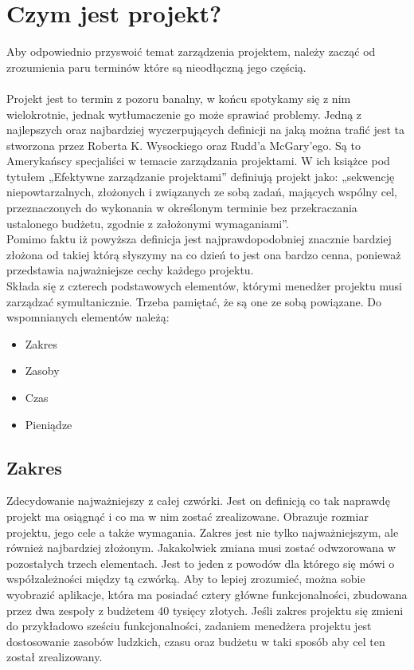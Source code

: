 \documentclass[oneside,polski,logo]{amuthesis}
\begin{document}
\section{Czym jest projekt?}
Aby odpowiednio przyswoić temat zarządzenia projektem, należy zacząć od zrozumienia paru terminów  które są nieodłączną jego częścią. \\ \\
Projekt jest to termin z pozoru banalny, w końcu spotykamy się z nim wielokrotnie, jednak wytłumaczenie go może sprawiać problemy. Jedną z najlepszych oraz najbardziej wyczerpujących definicji na jaką można trafić jest ta stworzona przez Roberta K. Wysockiego oraz Rudd’a McGary'ego. Są to Amerykańscy specjaliści w temacie zarządzania projektami. W ich książce pod tytułem „Efektywne zarządzanie projektami” definiują projekt jako: „sekwencję niepowtarzalnych, złożonych i związanych ze sobą zadań, mających wspólny cel, przeznaczonych do wykonania w określonym terminie bez przekraczania ustalonego budżetu, zgodnie z założonymi wymaganiami”. \cite{projekt} \\

Pomimo faktu iż powyższa definicja jest najprawdopodobniej znacznie bardziej złożona od takiej którą słyszymy na co dzień to jest ona bardzo cenna, ponieważ przedstawia najważniejsze cechy każdego projektu.\\

Składa się z czterech podstawowych elementów, którymi menedżer projektu musi zarządzać symultanicznie. Trzeba pamiętać, że są one ze sobą powiązane. Do wspomnianych elementów należą: 
\begin{itemize}
	\item Zakres
	\item Zasoby
	\item Czas
	\item Pieniądze
\end{itemize}

\subsection {Zakres}
Zdecydowanie najważniejszy z całej czwórki. Jest on definicją co tak naprawdę projekt ma osiągnąć i co ma w nim zostać zrealizowane. Obrazuje rozmiar projektu, jego cele a także wymagania. Zakres jest nie tylko najważniejszym, ale również najbardziej złożonym. Jakakolwiek zmiana musi zostać odwzorowana w pozostałych trzech elementach. Jest to jeden z powodów dla którego się mówi o współzależności między tą czwórką. Aby to lepiej zrozumieć, można sobie wyobrazić aplikacje, która ma posiadać cztery główne funkcjonalności, zbudowana przez dwa zespoły z budżetem 40 tysięcy złotych. Jeśli zakres projektu się zmieni do przykładowo sześciu funkcjonalności, zadaniem menedżera projektu jest dostosowanie zasobów ludzkich, czasu oraz budżetu w taki sposób aby cel ten został zrealizowany.
\end{document}
